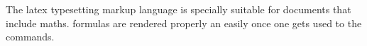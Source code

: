 \documentclass{article}
\begin{document}
 
The \Gls{latex} typesetting markup language is specially suitable 
for documents that include \gls{maths}. \Glspl{formula} are rendered 
properly an easily once one gets used to the commands.
 
\clearpage
 
\printglossary
 
\end{document}
